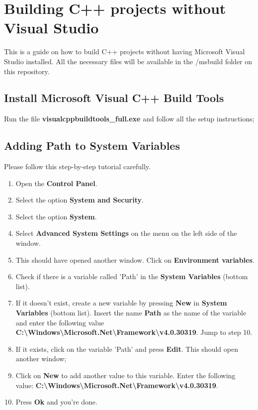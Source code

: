 \chapter{Building C++ projects without Visual Studio}

This is a guide on how to build C++ projects without having Microsoft Visual Studio installed.
All the necessary files will be available in the /msbuild folder on this repository.


\section{Install Microsoft Visual C++ Build Tools}
  Run the file \textbf{visualcppbuildtools\_full.exe} and follow all the setup instructions;
\section{Adding Path to System Variables}
  Please follow this step-by-step tutorial carefully.
  \begin{enumerate}
    \item Open the \textbf{Control Panel}.
    \item Select the option \textbf{System and Security}.
    \item Select the option \textbf{System}.
    \item Select \textbf{Advanced System Settings} on the menu on the left side of the window.
    \item This should have opened another window. Click on \textbf{Environment variables}.
    \item Check if there is a variable called 'Path' in the \textbf{System Variables} (bottom list).
    \item If it doesn't exist, create a new variable by pressing \textbf{New} in \textbf{System Variables} (bottom list). Insert the name \textbf{Path} as the name of the variable and enter the following value \textbf{C:\textbackslash{}Windows\textbackslash{}Microsoft.Net\textbackslash{}Framework\textbackslash{}v4.0.30319}. Jump to step 10.
    \item If it exists, click on the variable 'Path' and press \textbf{Edit}. This should open another window;
    \item Click on \textbf{New} to add another value to this variable. Enter the following value: \textbf{C:\textbackslash{}Windows\textbackslash{}Microsoft.Net\textbackslash{}Framework\textbackslash{}v4.0.30319}.
    \item Press \textbf{Ok} and you're done.
  \end{enumerate}

